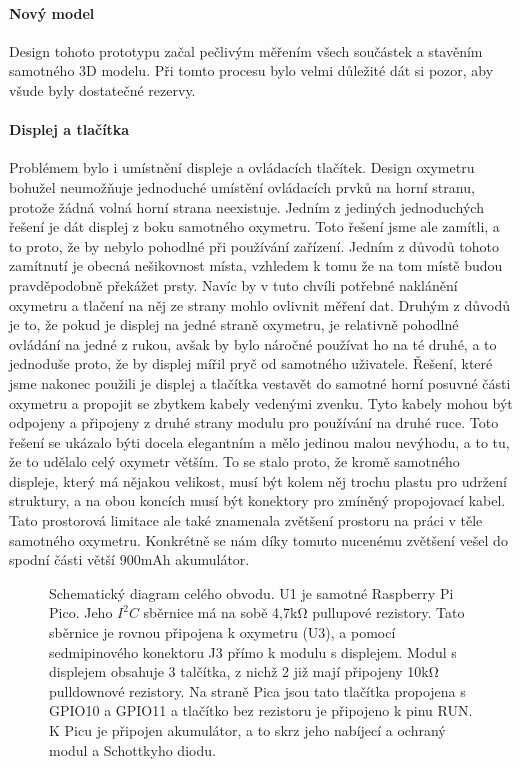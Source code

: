 \paragraph{Nový model}
Design tohoto prototypu začal pečlivým měřením všech součástek a stavěním samotného 3D modelu. Při tomto procesu bylo velmi důležité dát si pozor, aby všude byly dostatečné rezervy.
\paragraph{Displej a tlačítka}
Problémem bylo i umístnění displeje a ovládacích tlačítek. Design oxymetru bohužel neumožňuje jednoduché umístění ovládacích prvků na horní stranu, protože žádná volná horní strana neexistuje. Jedním z jediných jednoduchých řešení je dát displej z boku samotného oxymetru. Toto řešení jsme ale zamítli, a to proto, že by nebylo pohodlné při používání zařízení. Jedním z důvodů tohoto zamítnutí je obecná nešikovnost místa, vzhledem k tomu že na tom místě budou pravděpodobně překážet prsty. Navíc by v tuto chvíli potřebné naklánění oxymetru a tlačení na něj ze strany mohlo ovlivnit měření dat. Druhým z důvodů je to, že pokud je displej na jedné straně oxymetru, je relativně pohodlné ovládání na jedné z rukou, avšak by bylo náročné používat ho na té druhé, a to jednoduše proto, že by displej mířil pryč od samotného uživatele. Řešení, které jsme nakonec použili je displej a tlačítka vestavět do samotné horní posuvné části oxymetru a propojit se zbytkem kabely vedenými zvenku. Tyto kabely mohou být odpojeny a připojeny z druhé strany modulu pro používání na druhé ruce. Toto řešení se ukázalo býti docela elegantním a mělo jedinou malou nevýhodu, a to tu, že to udělalo celý oxymetr větším. To se stalo proto, že kromě samotného displeje, který má nějakou velikost, musí být kolem něj trochu plastu pro udržení struktury, a na obou koncích musí být konektory pro zmíněný propojovací kabel. Tato prostorová limitace ale také znamenala zvětšení prostoru na práci v těle samotného oxymetru. Konkrétně se nám díky tomuto nucenému zvětšení vešel do spodní části větší 900mAh akumulátor.
\begin{figure}[ht]
    \def\svgwidth{\columnwidth}
    
    \caption [Schematický diagram obvodu]{Schematický diagram celého obvodu. U1 je samotné Raspberry Pi Pico. Jeho $I^2C$ sběrnice má na sobě 4,7kΩ pullupové rezistory. Tato sběrnice je rovnou připojena k oxymetru (U3), a pomocí sedmipinového konektoru J3 přímo k modulu s displejem. Modul s displejem obsahuje 3 talčítka, z nichž 2 již mají připojeny 10kΩ pulldownové rezistory. Na straně Pica jsou tato tlačítka propojena s GPIO10 a GPIO11 a tlačítko bez rezistoru je připojeno k pinu RUN. K Picu je připojen akumulátor, a to skrz jeho nabíjecí a ochraný modul a Schottkyho diodu.}
    \label{fig:Diagram}
\end{figure}
